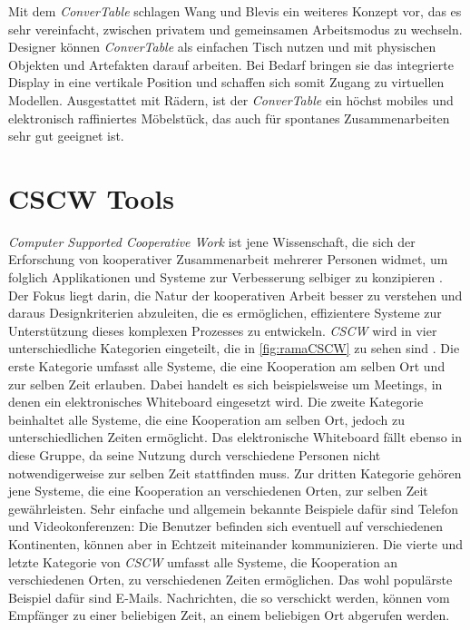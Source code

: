 Mit dem \emph{ConverTable} schlagen Wang und Blevis ein weiteres Konzept vor, das es sehr vereinfacht, zwischen privatem und gemeinsamen Arbeitsmodus zu wechseln. Designer können \emph{ConverTable} als einfachen Tisch nutzen und mit physischen Objekten und Artefakten darauf arbeiten. Bei Bedarf bringen sie das integrierte Display in eine vertikale Position und schaffen sich somit Zugang zu virtuellen Modellen. Ausgestattet mit Rädern, ist der \emph{ConverTable} ein höchst mobiles und elektronisch raffiniertes Möbelstück, das auch für spontanes Zusammenarbeiten sehr gut geeignet ist.

\section{CSCW Tools}
\emph{Computer Supported Cooperative Work} ist jene Wissenschaft, die sich der Erforschung von kooperativer Zusammenarbeit mehrerer Personen widmet, um folglich Applikationen und Systeme zur Verbesserung selbiger zu konzipieren \citep{Bannon:1990p244}. Der Fokus liegt darin, die Natur der kooperativen Arbeit besser zu verstehen und daraus Designkriterien abzuleiten, die es ermöglichen, effizientere Systeme zur Unterstützung dieses komplexen Prozesses zu entwickeln. \emph{CSCW} wird in vier unterschiedliche Kategorien eingeteilt, die in \autoref{fig:ramaCSCW} zu sehen sind \citep{Rama:2006p245}. Die erste Kategorie umfasst alle Systeme, die eine Kooperation am selben Ort und zur selben Zeit erlauben. Dabei handelt es sich beispielsweise um Meetings, in denen ein elektronisches Whiteboard eingesetzt wird. Die zweite Kategorie beinhaltet alle Systeme, die eine Kooperation am selben Ort, jedoch zu unterschiedlichen Zeiten ermöglicht. Das elektronische Whiteboard fällt ebenso in diese Gruppe, da seine Nutzung durch verschiedene Personen nicht notwendigerweise zur selben Zeit stattfinden muss. Zur dritten Kategorie gehören jene Systeme, die eine Kooperation an verschiedenen Orten, zur selben Zeit gewährleisten. Sehr einfache und allgemein bekannte Beispiele dafür sind Telefon und Videokonferenzen: Die Benutzer befinden sich eventuell auf verschiedenen Kontinenten, können aber in Echtzeit miteinander kommunizieren. Die vierte und letzte Kategorie von \emph{CSCW} umfasst alle Systeme, die Kooperation an verschiedenen Orten, zu verschiedenen Zeiten ermöglichen. Das wohl populärste Beispiel dafür sind E-Mails. Nachrichten, die so verschickt werden, können vom Empfänger zu einer beliebigen Zeit, an einem beliebigen Ort abgerufen werden.

